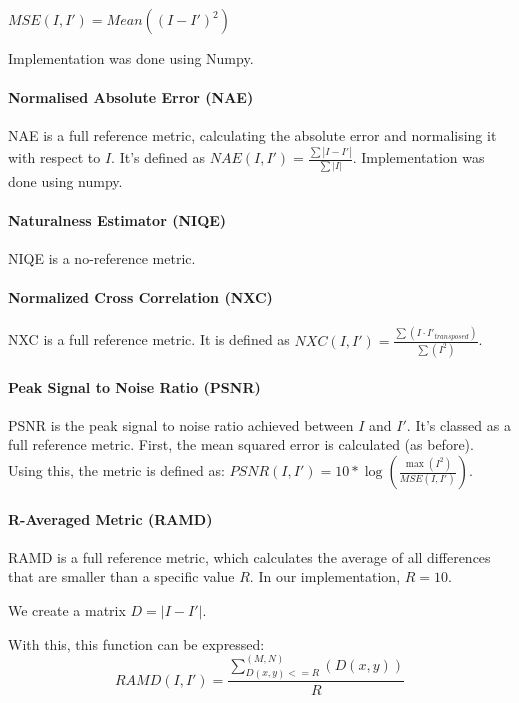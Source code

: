 \documentclass[11pt,a4paper]{article}
\begin{document}
                $MSE(I, I') = Mean((I - I')^ 2)$

                Implementation was done using Numpy.
            \paragraph{Normalised Absolute Error (NAE)}
                NAE is a full reference metric, calculating the absolute error and normalising it with respect to $I$. It's defined as $NAE(I, I') = \frac{\sum |I - I'|}{\sum |I|}$.
                Implementation was done using numpy.
            \paragraph{Naturalness Estimator (NIQE)}
                NIQE is a no-reference metric.

            \paragraph{Normalized Cross Correlation (NXC)}
                NXC is a full reference metric. It is defined as $NXC(I, I') = \frac{\sum (I \cdot I'_{transposed})}{\sum (I^2)}$.

            \paragraph{Peak Signal to Noise Ratio (PSNR)}
                PSNR is the peak signal to noise ratio achieved between $I$ and $I'$. It's classed as a full reference metric.
                First, the mean squared error is calculated (as before). Using this, the metric is defined as:
                $PSNR(I, I') = 10 * \log(\frac{\max(I^2)}{MSE(I, I')})$.

            \paragraph{R-Averaged Metric (RAMD)}
                RAMD is a full reference metric, which calculates the average of all differences that are smaller than a specific value $R$.
                In our implementation, $R=10$.

                We create a matrix $D = |I - I'|$.

                With this, this function can be expressed: $$RAMD(I, I') = \frac{\sum_{D(x, y) <= R}^{(M, N)}(D(x, y))}{R}$$
\end{document}
